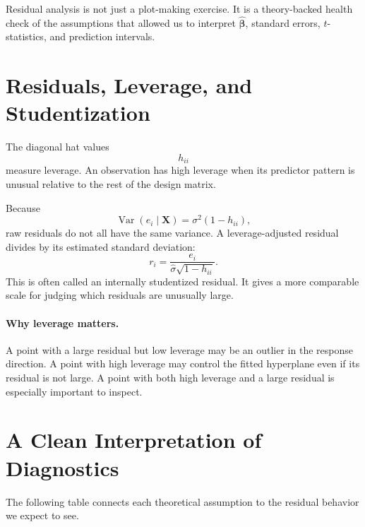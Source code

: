 Residual analysis is not just a plot-making exercise.  It is a theory-backed health check of the assumptions that allowed us to interpret \(\widehat{\boldsymbol{\beta}}\), standard errors, \(t\)-statistics, and prediction intervals.

\section{Residuals, Leverage, and Studentization}

The diagonal hat values
\begin{equation}
  h_{ii}
\end{equation}
measure leverage.  An observation has high leverage when its predictor pattern is unusual relative to the rest of the design matrix.

Because
\begin{equation}
  \operatorname{Var}(e_i\mid\mathbf{X})=\sigma^2(1-h_{ii}),
\end{equation}
raw residuals do not all have the same variance.  A leverage-adjusted residual divides by its estimated standard deviation:
\begin{equation}
  r_i=\frac{e_i}{\widehat{\sigma}\sqrt{1-h_{ii}}}.
\end{equation}
This is often called an internally studentized residual.  It gives a more comparable scale for judging which residuals are unusually large.

\paragraph{Why leverage matters.}
A point with a large residual but low leverage may be an outlier in the response direction.  A point with high leverage may control the fitted hyperplane even if its residual is not large.  A point with both high leverage and a large residual is especially important to inspect.

\section{A Clean Interpretation of Diagnostics}

The following table connects each theoretical assumption to the residual behavior we expect to see.


